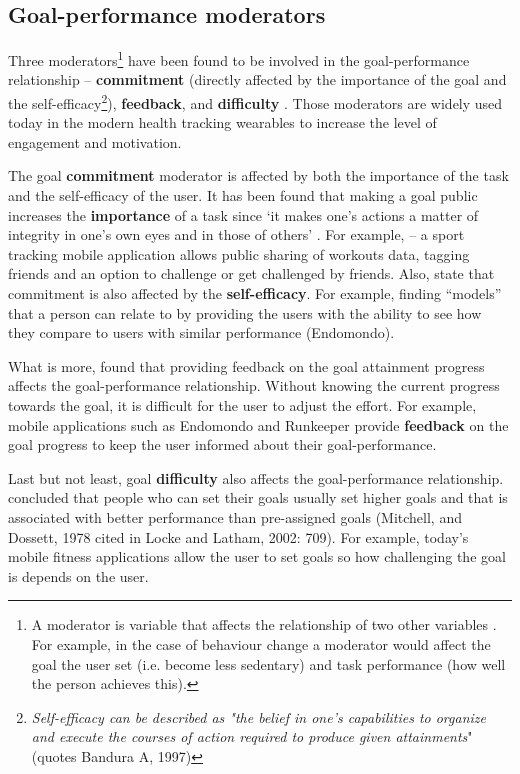     \subsection{Goal-performance moderators}
    \label{goal-moderators}
    Three moderators\footnote{A moderator is variable that affects the relationship of two other variables \citep{moderatormediator}. For example, in the case of behaviour change a moderator would affect the goal the user set (i.e. become less sedentary) and task performance (how well the person achieves this).} have been found to be involved in the goal-performance relationship – \textbf{commitment} (directly affected by the importance of the goal and the self-efficacy\footnote{\textit{Self-efficacy can be described as "the belief in one’s capabilities to organize and execute the courses of action required to produce given attainments}" \citep[308]{williams2011} (quotes Bandura A, 1997)}), \textbf{feedback}, and \textbf{difficulty} \citep[707]{locke2002}. Those moderators are widely used today in the modern health tracking wearables to increase the level of engagement and motivation.
    
    The goal \textbf{commitment} moderator is affected by both the importance of the task and the self-efficacy of the user. It has been found that making a goal public increases the \textbf{importance} of a task since ‘it makes one’s actions a matter of integrity in one’s own eyes and in those of others’ \citep[707]{locke2002}. For example, \citet[]{endomondo2017} – a sport tracking mobile application allows public sharing of workouts data, tagging friends and an option to challenge or get challenged by friends. Also, \citet[708]{locke2002} state that commitment is also affected by the \textbf{self-efficacy}. For example, finding “models” that a person can relate to by providing the users with the ability to see how they compare to users with similar performance (Endomondo).
    
    What is more, \citet[708]{locke2002} found that providing feedback on the goal attainment progress affects the goal-performance relationship. Without knowing the current progress towards the goal, it is difficult for the user to adjust the effort. For example, mobile applications such as Endomondo and Runkeeper \citep{fitnesskeeper2017} provide \textbf{feedback} on the goal progress to keep the user informed about their goal-performance.
    
    Last but not least, goal \textbf{difficulty} also affects the goal-performance relationship. \citet[709]{locke2002} concluded that people who can set their goals usually set higher goals and that is associated with better performance than pre-assigned goals (Mitchell, and Dossett, 1978 cited in Locke and Latham, 2002: 709). For example, today’s mobile fitness applications allow the user to set goals \citep{fitnesskeeper2017,endomondo2017} so how challenging the goal is depends on the user.
    

